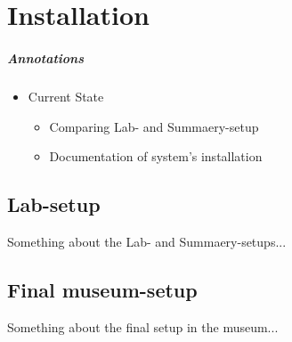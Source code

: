 \chapter{Installation}
\label{installation}

\paragraph{Annotations}

\begin{itemize}
	\item Current State
	\begin{itemize}
		\item Comparing Lab- and Summaery-setup
		\item Documentation of system's installation
	\end{itemize}
\end{itemize}



\section{Lab-setup}

Something about the Lab- and Summaery-setups...



\section{Final museum-setup}

Something about the final setup in the museum...
